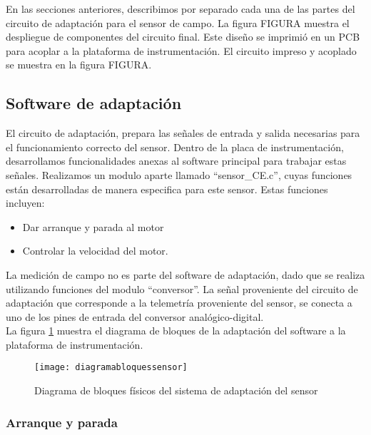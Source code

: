 En las secciones anteriores, describimos por separado cada una de las partes del circuito de adaptación para el sensor de campo. La figura FIGURA muestra el despliegue de componentes del circuito final. Este diseño se imprimió en un PCB para acoplar a la plataforma de instrumentación. El circuito impreso y acoplado se muestra en la figura FIGURA.





\subsection{Software de adaptación} %
\label{it6:sec:software_de_adaptacion}


El circuito de adaptación, prepara las señales de entrada y salida necesarias para el funcionamiento correcto del sensor. Dentro de la placa de instrumentación, desarrollamos funcionalidades anexas al software principal para trabajar estas señales.
Realizamos un modulo aparte llamado ``sensor\_CE.c'', cuyas funciones están desarrolladas de manera especifica para este sensor. Estas funciones incluyen:

\begin{itemize}
  \item Dar arranque y parada al motor
  \item Controlar la velocidad del motor.
\end{itemize}

La medición de campo no es parte del software de adaptación, dado que se realiza utilizando funciones del modulo ``conversor''. La señal proveniente del circuito de adaptación que corresponde a la telemetría proveniente del sensor, se conecta a uno de los pines de entrada del conversor analógico-digital. \\

La figura \ref{fig:diagramabloquessensor} muestra el diagrama de bloques de la adaptación del software a la plataforma de instrumentación.

\begin{figure}[h]
  \centering
  \texttt{[image: diagramabloquessensor]}
  \caption{Diagrama de bloques físicos del sistema de adaptación del sensor}\label{fig:diagramabloquessensor}
\end{figure}

\subsubsection{Arranque y parada} %
\label{it6:ssub:arranque_y_parada}

